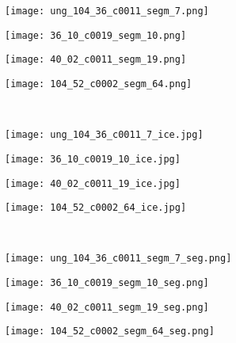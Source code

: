 \begin{figure}
\centering
\begin{subfigure}{.19\textwidth}
\centering
  \texttt{[image: ung\_104\_36\_c0011\_segm\_7.png]}
\end{subfigure}
\begin{subfigure}{.19\textwidth}
  \centering
  \texttt{[image: 36\_10\_c0019\_segm\_10.png]}
\end{subfigure}
\begin{subfigure}{.19\textwidth}
  \centering
  \texttt{[image: 40\_02\_c0011\_segm\_19.png]}
\end{subfigure}
\begin{subfigure}{.19\textwidth}
  \centering
  \texttt{[image: 104\_52\_c0002\_segm\_64.png]}\\
\end{subfigure}\\
\begin{subfigure}{.198\textwidth}
\centering
  \texttt{[image: ung\_104\_36\_c0011\_7\_ice.jpg]}
\end{subfigure}%
\begin{subfigure}{.19\textwidth}
  \centering
  \texttt{[image: 36\_10\_c0019\_10\_ice.jpg]}
\end{subfigure}
\begin{subfigure}{.19\textwidth}
  \centering
  \texttt{[image: 40\_02\_c0011\_19\_ice.jpg]}
\end{subfigure}
\begin{subfigure}{.189\textwidth}
  \centering
  \texttt{[image: 104\_52\_c0002\_64\_ice.jpg]}
\end{subfigure}\\
\begin{subfigure}{.19\textwidth}
\centering
  \texttt{[image: ung\_104\_36\_c0011\_segm\_7\_seg.png]}
\end{subfigure}
\begin{subfigure}{.19\textwidth}
  \centering
  \texttt{[image: 36\_10\_c0019\_segm\_10\_seg.png]}
\end{subfigure}
\begin{subfigure}{.19\textwidth}
  \centering
  \texttt{[image: 40\_02\_c0011\_segm\_19\_seg.png]}
\end{subfigure}
\begin{subfigure}{.19\textwidth}
  \centering
  \texttt{[image: 104\_52\_c0002\_segm\_64\_seg.png]}\\
\end{subfigure}\\

\end{figure}
